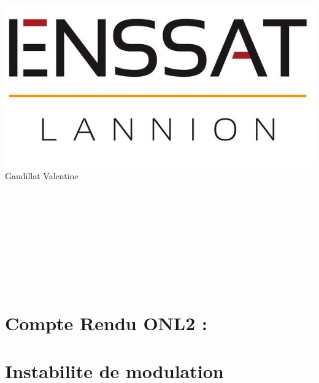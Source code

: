 \documentclass[a4paper,12pt,titlepage]{article}
\begin{document}
	
		
	 
	{\hfill \includegraphics[scale=0.15]{LogoENSSAT.jpg}}\\
	Gaudillat Valentine \\ 

    
    
	\begin{verbatim}
	
	
	
	
	
	

	

	\end{verbatim}
	{\centering \section*{Compte Rendu ONL2 :} \section*{Instabilite de modulation}}
	\begin{verbatim}
	
	
	
	
	\end{verbatim}
	
	\begin{center}
	\end{center}
		
		
		
		
		
		
		
		
		
		
		
		
	
	\clearpage
	\tableofcontents 
	\newpage
\end{document}
